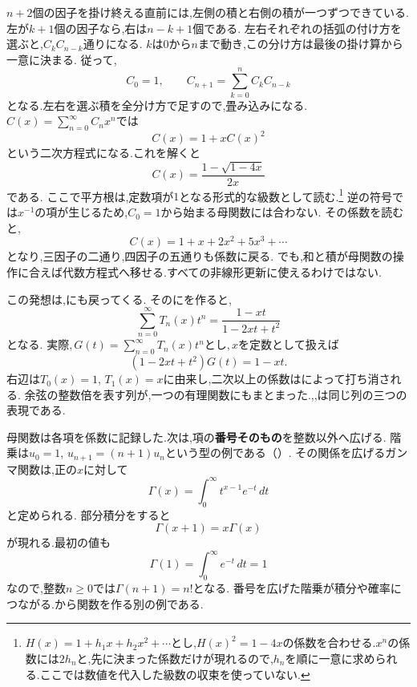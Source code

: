 $n+2$個の因子を掛け終える直前には,左側の積と右側の積が一つずつできている.
左が$k+1$個の因子なら,右は$n-k+1$個である.
左右それぞれの括弧の付け方を選ぶと,$C_kC_{n-k}$通りになる.
$k$は$0$から$n$まで動き,この分け方は最後の掛け算から一意に決まる.
従って,
\[
  C_0=1,\qquad C_{n+1}=\sum_{k=0}^{n}C_kC_{n-k}
\]
となる.左右を選ぶ積を全分け方で足すので,畳み込みになる.
$C(x)=\sum_{n=0}^{\infty}C_nx^n$では
\[
  C(x)=1+xC(x)^2
\]
という二次方程式になる.これを解くと
\[
  C(x)=\frac{1-\sqrt{1-4x}}{2x}
\]
である.
ここで平方根は,定数項が$1$となる形式的な級数として読む.\footnote{$H(x)=1+h_1x+h_2x^2+\cdots$とし,$H(x)^2=1-4x$の係数を合わせる.$x^n$の係数には$2h_n$と,先に決まった係数だけが現れるので,$h_n$を順に一意に求められる.ここでは数値を代入した級数の収束を使っていない.}
逆の符号では$x^{-1}$の項が生じるため,$C_0=1$から始まる母関数には合わない.
その係数を読むと,
\[
  C(x)=1+x+2x^2+5x^3+\cdots
\]
となり,三因子の二通り,四因子の五通りも係数に戻る.
でも,和と積が母関数の操作に合えば代数方程式へ移せる.すべての非線形更新に使えるわけではない.

この発想は,にも戻ってくる.
そのにを作ると,
\[
  \sum_{n=0}^{\infty}T_n(x)t^n
  =\frac{1-xt}{1-2xt+t^2}
\]
となる.
実際,\,$G(t)=\sum_{n=0}^\infty T_n(x)t^n$とし,\,$x$を定数として扱えば
\[
  (1-2xt+t^2)G(t)=1-xt.
\]
右辺は$T_0(x)=1$, $T_1(x)=x$に由来し,二次以上の係数はによって打ち消される.
余弦の整数倍を表す列が,一つの有理関数にもまとまった.,,は同じ列の三つの表現である.

母関数は各項を係数に記録した.次は,項の\textbf{番号そのもの}を整数以外へ広げる.
階乗は$u_0=1$, $u_{n+1}=(n+1)u_n$という型の例である（）.
その関係を広げるガンマ関数は,正の$x$に対して
\[
  \Gamma(x)=\int_0^\infty t^{x-1}e^{-t}\,dt
\]
と定められる.
部分積分をすると
\[
  \Gamma(x+1)=x\Gamma(x)
\]
が現れる.最初の値も
\[
  \Gamma(1)=\int_0^\infty e^{-t}\,dt=1
\]
なので,整数$n\ge0$では$\Gamma(n+1)=n!$となる.
番号を広げた階乗が積分や確率につながる.から関数を作る別の例である.

